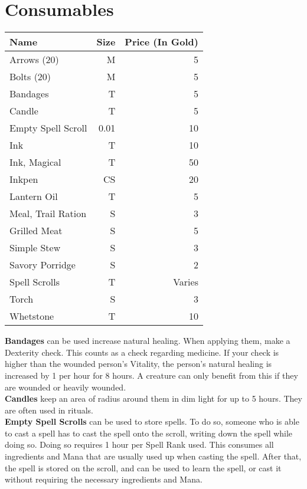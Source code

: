 \section{Consumables}\label{sec:consumables}
\begin{longtable}{l | r | r}
	Name & Size & Price (In Gold)\\ \hline
	Arrows (20) & M & 5\\
	Bolts (20) & M & 5\\
	Bandages & T & 5\\
	Candle & T & 5\\
	Empty Spell Scroll & 0.01 & 10\\
	Ink & T & 10\\
	Ink, Magical & T & 50\\
	Inkpen & CS & 20\\
	Lantern Oil & T & 5\\
	Meal, Trail Ration & S & 3\\
	Grilled Meat & S & 5\\
	Simple Stew & S & 3\\
	Savory Porridge & S & 2\\
	Spell Scrolls & T & Varies\\
	Torch & S & 3\\
	Whetstone & T & 10\\
\end{longtable}


\textbf{Bandages} can be used increase natural healing.
When applying them, make a Dexterity check.
This counts as a check regarding medicine.
If your check is higher than the wounded person's Vitality, the person's natural healing is increased by 1 per hour for 8 hours.
A creature can only benefit from this if they are wounded or heavily wounded.\\

\textbf{Candles} keep an area of  radius around them in dim light for up to 5 hours.
They are often used in rituals.\\

\textbf{Empty Spell Scrolls} can be used to store spells.
To do so, someone who is able to cast a spell has to cast the spell onto the scroll, writing down the spell while doing so.
Doing so requires 1 hour per Spell Rank used.
This consumes all ingredients and Mana that are usually used up when casting the spell.
After that, the spell is stored on the scroll, and can be used to learn the spell, or cast it without requiring the necessary ingredients and Mana.

